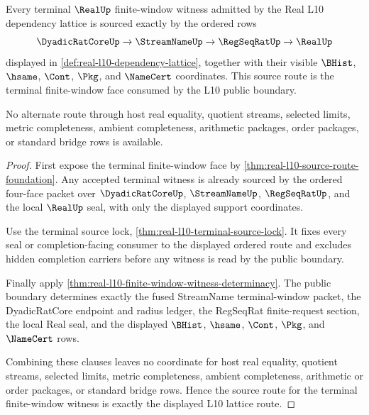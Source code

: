 \begin{theorem}
\label{thm:real-l10-source-route-exactness}
Every terminal $\RealUp$ finite-window witness admitted by the Real L10 dependency lattice is sourced exactly by the ordered rows
$$
\DyadicRatCoreUp \to \StreamNameUp \to \RegSeqRatUp \to \RealUp
$$
displayed in \autoref{def:real-l10-dependency-lattice}, together with their visible $\BHist$, $\hsame$, $\Cont$, $\Pkg$, and $\NameCert$ coordinates. This source route is the terminal finite-window face consumed by the L10 public boundary.

No alternate route through host real equality, quotient streams, selected limits, metric completeness, ambient completeness, arithmetic packages, order packages, or standard bridge rows is available.
\end{theorem}
\begin{proof}
First expose the terminal finite-window face by \autoref{thm:real-l10-source-route-foundation}. Any accepted terminal witness is already sourced by the ordered four-face packet over $\DyadicRatCoreUp$, $\StreamNameUp$, $\RegSeqRatUp$, and the local $\RealUp$ seal, with only the displayed support coordinates.

Use the terminal source lock, \autoref{thm:real-l10-terminal-source-lock}. It fixes every seal or completion-facing consumer to the displayed ordered route and excludes hidden completion carriers before any witness is read by the public boundary.

Finally apply \autoref{thm:real-l10-finite-window-witness-determinacy}. The public boundary determines exactly the fused StreamName terminal-window packet, the DyadicRatCore endpoint and radius ledger, the RegSeqRat finite-request section, the local Real seal, and the displayed $\BHist$, $\hsame$, $\Cont$, $\Pkg$, and $\NameCert$ rows.

Combining these clauses leaves no coordinate for host real equality, quotient streams, selected limits, metric completeness, ambient completeness, arithmetic or order packages, or standard bridge rows. Hence the source route for the terminal finite-window witness is exactly the displayed L10 lattice route.
\end{proof}

